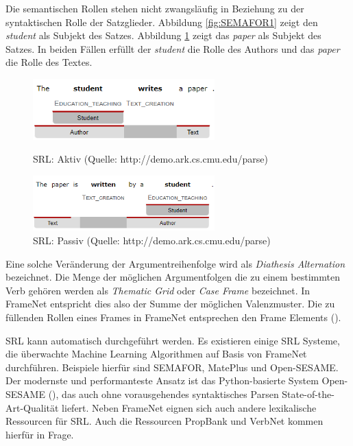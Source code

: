 Die semantischen Rollen stehen nicht zwangsläufig in Beziehung zu der syntaktischen Rolle der Satzglieder. Abbildung  \ref{fig:SEMAFOR1} zeigt den \textit{student} als Subjekt des Satzes. Abbildung \ref{fig:SEMAFOR2} zeigt das \textit{paper} als Subjekt des Satzes. In beiden Fällen erfüllt der \textit{student} die Rolle des Authors und das \textit{paper} die Rolle des Textes.
\par
\begin{figure}
\includegraphics[width=7cm]{pictures/SEMAFOR1.png}
\caption{\ac{SRL}: Aktiv (Quelle: http://demo.ark.cs.cmu.edu/parse)}
\label{fig:SEMAFOR1}
\includegraphics[width=7cm]{pictures/SEMAFOR2.png}
\caption{\ac{SRL}: Passiv (Quelle: http://demo.ark.cs.cmu.edu/parse)}
\label{fig:SEMAFOR2}
\end{figure}
\par
Eine solche Veränderung der Argumentreihenfolge wird als \textit{Diathesis Alternation} bezeichnet. Die Menge der möglichen Argumentfolgen die zu einem bestimmten Verb gehören werden als \textit{Thematic Grid} oder \textit{Case Frame} bezeichnet. In FrameNet entspricht dies also der Summe der möglichen Valenzmuster. Die zu füllenden Rollen eines Frames in FrameNet entsprechen den Frame Elements (\cite[vgl.][383]{JURAFSKY}).
\par
\ac{SRL} kann automatisch durchgeführt werden. Es existieren einige \ac{SRL} Systeme, die überwachte Machine Learning Algorithmen auf Basis von FrameNet durchführen. Beispiele hierfür sind SEMAFOR, MatePlus und Open-SESAME. Der modernste und performanteste Ansatz ist das Python-basierte System Open-SESAME (\cite[vgl.][8]{SWAYAMDIPTA}), das auch ohne vorausgehendes syntaktisches Parsen State-of-the-Art-Qualität liefert.
Neben FrameNet eignen sich auch andere lexikalische Ressourcen für \ac{SRL}. Auch die Ressourcen PropBank und VerbNet kommen hierfür in Frage.
